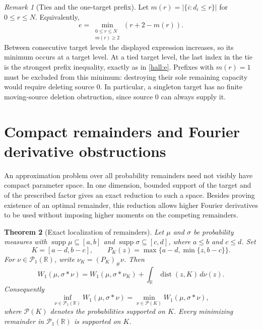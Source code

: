\documentclass[11pt,letterpaper]{article}
\newtheorem{theorem}{Theorem}[section]
\theoremstyle{definition}
\theoremstyle{remark}
\newtheorem{remark}[theorem]{Remark}
\newcommand{\R}{\mathbb R}
\newcommand{\Pone}{\mathcal P_1(\R)}
\newcommand{\supp}{\operatorname{supp}}
\begin{document}
\begin{remark}[Ties and the one-target prefix]
\label{hall:ties}
Let $m(r)=|\{i:d_i\le r\}|$ for $0\le r\le N$. Equivalently,
\[
 e=\min_{\substack{0\le r\le N\\m(r)\ge2}}
       (r+2-m(r)).
\]
Between consecutive target levels the displayed expression increases,
so its minimum occurs at a target level. At a tied target level, the last
index in the tie is the strongest prefix inequality, exactly as in
\eqref{hall:e}. Prefixes with $m(r)=1$ must be excluded from this minimum:
destroying their sole remaining capacity would require deleting source
$0$. In particular, a singleton target has no finite moving-source
deletion obstruction, since source $0$ can always supply it.
\end{remark}



\section{Compact remainders and Fourier derivative obstructions}
\label{transport:section}

An approximation problem over all probability remainders need not visibly
have compact parameter space.  In one dimension, bounded support of the
target and of the prescribed factor gives an exact reduction to such a
space.  Besides proving existence of an optimal remainder, this reduction
allows higher Fourier derivatives to be used without imposing higher
moments on the competing remainders.

\begin{theorem}[Exact localization of remainders]
\label{transport:clipping}
Let $\mu$ and $\sigma$ be probability measures with
$\supp\mu\subseteq[a,b]$ and $\supp\sigma\subseteq[c,d]$, where
$a\le b$ and $c\le d$.  Set
\[
 K=[a-d,b-c],\qquad
 P_K(z)=\max\{a-d,\min\{z,b-c\}\}.
\]
For $\nu\in\Pone$, write $\nu_K=(P_K)_\#\nu$.  Then
\begin{equation}\label{transport:exact-clipping}
 W_1(\mu,\sigma*\nu)
 =W_1(\mu,\sigma*\nu_K)
   +\int_{\R}\operatorname{dist}(z,K)\,d\nu(z).
\end{equation}
Consequently
\begin{equation}\label{transport:attainment}
 \inf_{\nu\in\Pone}W_1(\mu,\sigma*\nu)
 =\min_{\nu\in\mathcal P(K)}W_1(\mu,\sigma*\nu),
\end{equation}
where $\mathcal P(K)$ denotes the probabilities supported on $K$.
Every minimizing remainder in $\Pone$ is supported on $K$.
\end{theorem}
\end{document}
